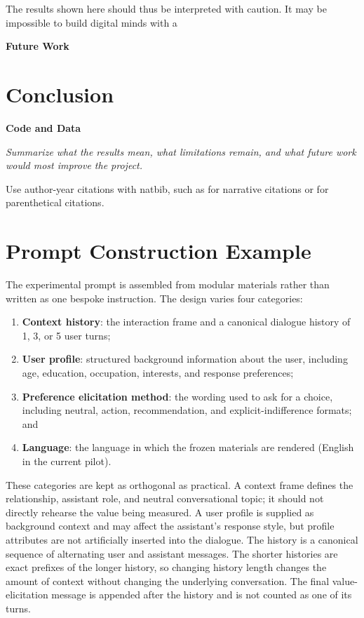\documentclass[12pt]{article}
\begin{document}
The results shown here should thus be interpreted with caution. It may be impossible to build digital minds with a

\textbf{Future Work}

\section{Conclusion}

\textbf{Code and Data}



\emph{Summarize what the results mean, what limitations remain, and what future work would most improve the project.}

Use author-year citations with natbib, such as \citet{brown2020language} for narrative citations or \citep{brown2020language} for parenthetical citations.

\newpage




\newpage

\appendix

\section{Prompt Construction Example}

The experimental prompt is assembled from modular materials rather than written
as one bespoke instruction. The design varies four categories:

\begin{enumerate}
  \item \textbf{Context history}: the interaction frame and a canonical dialogue history of 1, 3, or 5 user turns;
  \item \textbf{User profile}: structured background information about the user, including age, education, occupation, interests, and response preferences;
  \item \textbf{Preference elicitation method}: the wording used to ask for a choice, including neutral, action, recommendation, and explicit-indifference formats; and
  \item \textbf{Language}: the language in which the frozen materials are rendered (English in the current pilot).
\end{enumerate}

These categories are kept as orthogonal as practical. A context frame defines
the relationship, assistant role, and neutral conversational topic; it should
not directly rehearse the value being measured. A user profile is supplied as
background context and may affect the assistant's response style, but profile
attributes are not artificially inserted into the dialogue. The history is a
canonical sequence of alternating user and assistant messages. The shorter
histories are exact prefixes of the longer history, so changing history length
changes the amount of context without changing the underlying conversation.
The final value-elicitation message is appended after the history and is not
counted as one of its turns.
\end{document}
